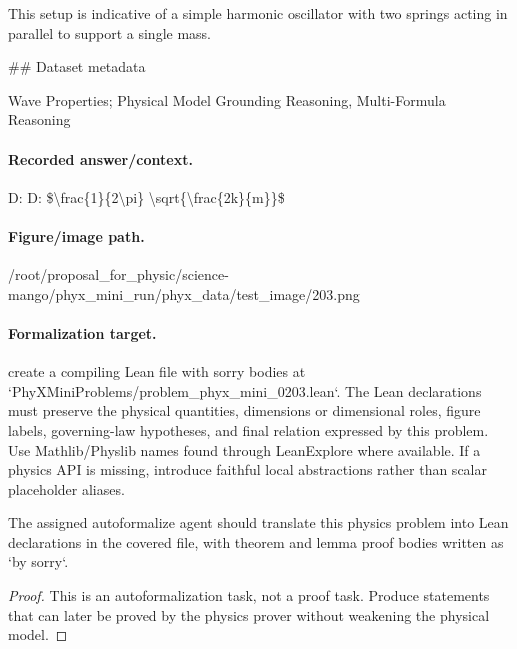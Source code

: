 This setup is indicative of a simple harmonic oscillator with two springs acting in parallel to support a single mass.

\#\# Dataset metadata

Wave Properties; Physical Model Grounding Reasoning, Multi-Formula Reasoning

\paragraph{Recorded answer/context.}
D: D: \$\textbackslash{}frac\{1\}\{2\textbackslash{}pi\} \textbackslash{}sqrt\{\textbackslash{}frac\{2k\}\{m\}\}\$

\paragraph{Figure/image path.}
/root/proposal\_for\_physic/science-mango/phyx\_mini\_run/phyx\_data/test\_image/203.png

\paragraph{Formalization target.}
create a compiling Lean file with sorry bodies at `PhyXMiniProblems/problem\_phyx\_mini\_0203.lean`. The Lean declarations must preserve the physical quantities, dimensions or dimensional roles, figure labels, governing-law hypotheses, and final relation expressed by this problem.
Use Mathlib/Physlib names found through LeanExplore where available. If a physics API is missing, introduce faithful local abstractions rather than scalar placeholder aliases.

\begin{theorem}
\label{thm:physics:phyx_mini_0203:target}
The assigned autoformalize agent should translate this physics problem into Lean declarations in the covered file, with theorem and lemma proof bodies written as `by sorry`.
\end{theorem}
\begin{proof}
This is an autoformalization task, not a proof task. Produce statements that can later be proved by the physics prover without weakening the physical model.
\end{proof}

